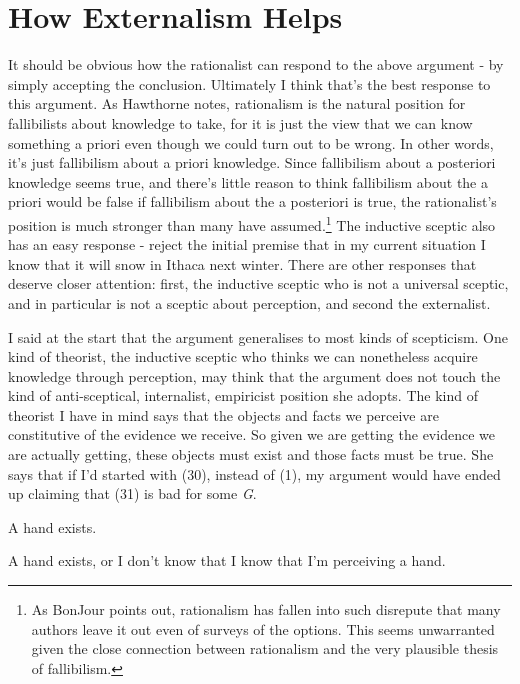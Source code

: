 \documentclass[
  11pt,
  letterpaper,
  DIV=11,
  numbers=noendperiod,
  twoside]{scrartcl}
\providecommand{\tightlist}{%
  \setlength{\itemsep}{0pt}\setlength{\parskip}{0pt}}
\begin{document}
\section{How Externalism Helps}\label{how-externalism-helps}

It should be obvious how the rationalist can respond to the above
argument - by simply accepting the conclusion. Ultimately I think that's
the best response to this argument. As Hawthorne notes, rationalism is
the natural position for fallibilists about knowledge to take, for it is
just the view that we can know something a priori even though we could
turn out to be wrong. In other words, it's just fallibilism about a
priori knowledge. Since fallibilism about a posteriori knowledge seems
true, and there's little reason to think fallibilism about the a priori
would be false if fallibilism about the a posteriori is true, the
rationalist's position is much stronger than many have
assumed.\footnote{As BonJour points out, rationalism has fallen into
  such disrepute that many authors leave it out even of surveys of the
  options. This seems unwarranted given the close connection between
  rationalism and the very plausible thesis of fallibilism.} The
inductive sceptic also has an easy response - reject the initial premise
that in my current situation I know that it will snow in Ithaca next
winter. There are other responses that deserve closer attention: first,
the inductive sceptic who is not a universal sceptic, and in particular
is not a sceptic about perception, and second the externalist.

I said at the start that the argument generalises to most kinds of
scepticism. One kind of theorist, the inductive sceptic who thinks we
can nonetheless acquire knowledge through perception, may think that the
argument does not touch the kind of anti-sceptical, internalist,
empiricist position she adopts. The kind of theorist I have in mind says
that the objects and facts we perceive are constitutive of the evidence
we receive. So given we are getting the evidence we are actually
getting, these objects must exist and those facts must be true. She says
that if I'd started with (30), instead of (1), my argument would have
ended up claiming that (31) is bad for some \emph{G}.

\begin{description}
\tightlist
\item[(30)]
A hand exists.
\item[(31)]
A hand exists, or I don't know that I know that I'm perceiving a hand.
\end{description}
\end{document}
